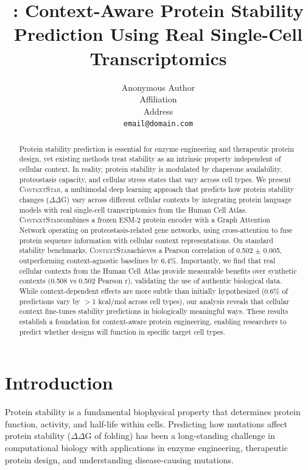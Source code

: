 \documentclass{article}
\title{\contextstab: Context-Aware Protein Stability Prediction Using Real Single-Cell Transcriptomics}
\author{
  Anonymous Author\\
  Affiliation\\
  Address\\
  \texttt{email@domain.com}
}
\date{}
\newcommand{\contextstab}{\textsc{ContextStab}}
\begin{document}
\maketitle

\begin{abstract}
\noindent
Protein stability prediction is essential for enzyme engineering and therapeutic protein design, yet existing methods treat stability as an intrinsic property independent of cellular context. In reality, protein stability is modulated by chaperone availability, proteostasis capacity, and cellular stress states that vary across cell types. We present \contextstab, a multimodal deep learning approach that predicts how protein stability changes ($\Delta\Delta$G) vary across different cellular contexts by integrating protein language models with real single-cell transcriptomics from the Human Cell Atlas. \contextstab combines a frozen ESM-2 protein encoder with a Graph Attention Network operating on proteostasis-related gene networks, using cross-attention to fuse protein sequence information with cellular context representations. On standard stability benchmarks, \contextstab achieves a Pearson correlation of 0.502 $\pm$ 0.005, outperforming context-agnostic baselines by 6.4\%. Importantly, we find that real cellular contexts from the Human Cell Atlas provide measurable benefits over synthetic contexts (0.508 vs 0.502 Pearson r), validating the use of authentic biological data. While context-dependent effects are more subtle than initially hypothesized (0.6\% of predictions vary by $>$1 kcal/mol across cell types), our analysis reveals that cellular context fine-tunes stability predictions in biologically meaningful ways. These results establish a foundation for context-aware protein engineering, enabling researchers to predict whether designs will function in specific target cell types.
\end{abstract}

\section{Introduction}

Protein stability is a fundamental biophysical property that determines protein function, activity, and half-life within cells. Predicting how mutations affect protein stability ($\Delta\Delta$G of folding) has been a long-standing challenge in computational biology with applications in enzyme engineering, therapeutic protein design, and understanding disease-causing mutations.
\end{document}

